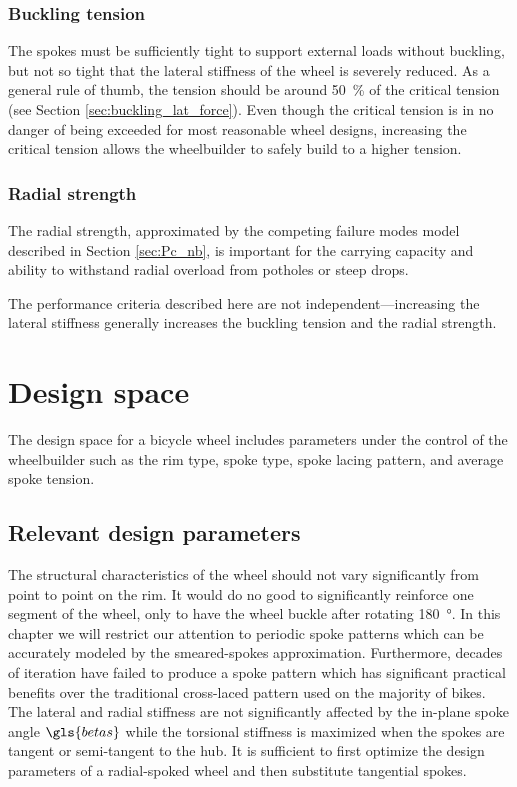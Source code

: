 \documentclass[\rootdir/thesis.tex]{subfiles}
\begin{document}
\subsubsection*{Buckling tension}
The spokes must be sufficiently tight to support external loads without buckling, but not so tight that the lateral stiffness of the wheel is severely reduced. As a general rule of thumb, the tension should be around \SI{50}{\percent} of the critical tension (see Section \ref{sec:buckling_lat_force}). Even though the critical tension is in no danger of being exceeded for most reasonable wheel designs, increasing the critical tension allows the wheelbuilder to safely build to a higher tension.

\subsubsection*{Radial strength}
The radial strength, approximated by the competing failure modes model described in Section \ref{sec:Pc_nb}, is important for the carrying capacity and ability to withstand radial overload from potholes or steep drops.

The performance criteria described here are not independent---increasing the lateral stiffness generally increases the buckling tension and the radial strength.


\section{Design space}

The design space for a bicycle wheel includes parameters under the control of the wheelbuilder such as the rim type, spoke type, spoke lacing pattern, and average spoke tension.

\subsection{Relevant design parameters}

The structural characteristics of the wheel should not vary significantly from point to point on the rim. It would do no good to significantly reinforce one segment of the wheel, only to have the wheel buckle after rotating \SI{180}{\degree}. In this chapter we will restrict our attention to periodic spoke patterns which can be accurately modeled by the smeared-spokes approximation. Furthermore, decades of iteration have failed to produce a spoke pattern which has significant practical benefits over the traditional cross-laced pattern used on the majority of bikes. The lateral and radial stiffness are not significantly affected by the in-plane spoke angle $\gls{betas}$ while the torsional stiffness is maximized when the spokes are tangent or semi-tangent to the hub. It is sufficient to first optimize the design parameters of a radial-spoked wheel and then substitute tangential spokes.
\end{document}
